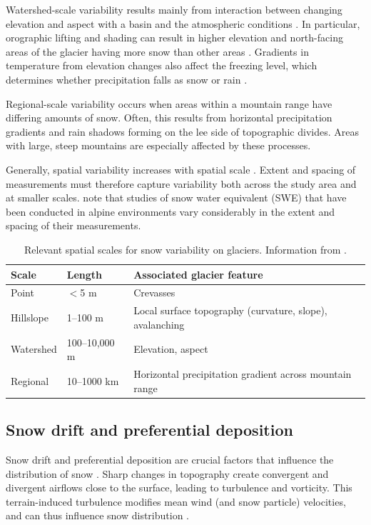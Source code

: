 \documentclass{sfuthesis}
\begin{document}
Watershed-scale variability results mainly from interaction between changing elevation and aspect with a basin and the atmospheric conditions \citep{Clark2011}. In particular, orographic lifting and shading can result in higher elevation and north-facing areas of the glacier having more snow than other areas \citep{Mott2008, Sold2013}. Gradients in temperature from elevation changes also affect the freezing level, which determines whether precipitation falls as snow or rain \citep{Bloschl1991}. 

Regional-scale variability occurs when areas within a mountain range have differing amounts of snow. Often, this results from horizontal precipitation gradients and rain shadows forming on the lee side of topographic divides. Areas with large, steep mountains are especially affected by these processes.

Generally, spatial variability increases with spatial scale \citep{Clark2011}. Extent and spacing of measurements must therefore capture variability both across the study area and at smaller scales. \cite{Clark2011} note that studies of snow water equivalent (SWE) that have been conducted in alpine environments vary considerably in the extent and spacing of their measurements. 

\begin{table}[]
\centering
\caption{Relevant spatial scales for snow variability on glaciers. Information from \cite{Clark2011}.}
\label{scale}
\begin{tabular}{lll}
\textbf{Scale} & \textbf{Length} & \textbf{Associated glacier feature}                     \\ \hline
Point          & $<$5 m         & Crevasses                                               \\
Hillslope      & 1--100 m        & Local surface topography (curvature, slope), avalanching        \\
Watershed      & 100--10,000 m   & Elevation, aspect                                       \\
Regional       & 10--1000 km     & Horizontal precipitation gradient across mountain range
\end{tabular}
\end{table}

\subsection{Snow drift and preferential deposition}
Snow drift and preferential deposition are crucial factors that influence the distribution of snow \citep{Lehning2008, Winstral2002, Clark2011}. Sharp changes in topography create convergent and divergent airflows close to the surface, leading to turbulence and vorticity. This terrain-induced turbulence modifies mean wind (and snow particle) velocities, and can thus influence snow distribution \citep{Mott2008, Lehning2008, Dadic2010}.
\end{document}
